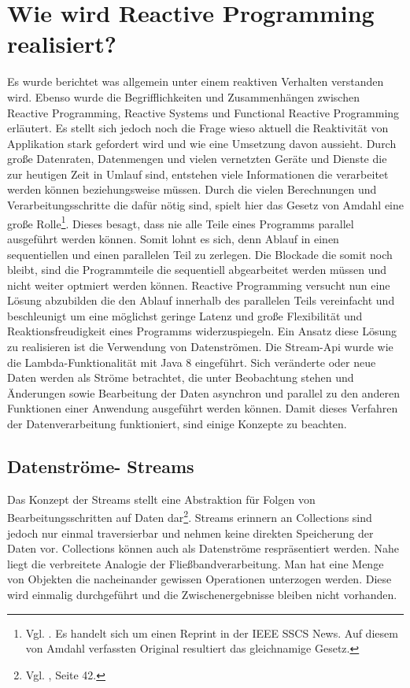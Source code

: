 \section{Wie wird Reactive Programming realisiert?}
Es wurde berichtet was allgemein unter einem reaktiven Verhalten verstanden wird. Ebenso wurde die Begrifflichkeiten und Zusammenhängen zwischen Reactive Programming, Reactive Systems und Functional Reactive Programming erläutert. Es stellt sich jedoch noch die Frage wieso aktuell die Reaktivität von Applikation stark gefordert wird und wie eine Umsetzung davon aussieht. Durch große Datenraten, Datenmengen und vielen vernetzten Geräte und Dienste die zur heutigen Zeit in Umlauf sind, entstehen viele Informationen die verarbeitet werden können beziehungsweise müssen. Durch die vielen Berechnungen und Verarbeitungsschritte die dafür nötig sind, spielt hier das Gesetz von Amdahl eine große Rolle\footnote{Vgl. \cite{Amdahl.}. Es handelt sich um einen Reprint in der IEEE SSCS News. Auf diesem von Amdahl verfassten Original resultiert das gleichnamige Gesetz.}. Dieses besagt, dass nie alle Teile eines Programms parallel ausgeführt werden können. Somit lohnt es sich, denn Ablauf in einen sequentiellen und einen parallelen Teil zu zerlegen. Die Blockade die somit noch bleibt, sind die Programmteile die sequentiell abgearbeitet werden müssen und nicht weiter optmiert werden können. Reactive Programming versucht nun eine Lösung abzubilden die den Ablauf innerhalb des parallelen Teils vereinfacht und beschleunigt um eine möglichst geringe Latenz und große Flexibilität und Reaktionsfreudigkeit eines Programms widerzuspiegeln. Ein Ansatz diese Lösung zu realisieren ist die Verwendung von Datenströmen. Die Stream-Api wurde wie die Lambda-Funktionalität mit Java 8 eingeführt. Sich veränderte oder neue Daten werden als Ströme betrachtet, die unter Beobachtung stehen und Änderungen sowie Bearbeitung der Daten asynchron und parallel zu den anderen Funktionen einer Anwendung ausgeführt werden können. Damit dieses Verfahren der Datenverarbeitung funktioniert, sind einige Konzepte zu beachten.
\subsection{Datenströme- Streams}
Das Konzept der Streams stellt eine Abstraktion für Folgen von Bearbeitungsschritten auf Daten dar\footnote{Vgl. \cite{Inden.2015}, Seite 42.}. Streams erinnern an Collections sind jedoch nur einmal traversierbar und nehmen keine direkten Speicherung der Daten vor. Collections können auch als Datenströme respräsentiert werden. Nahe liegt die verbreitete Analogie der Fließbandverarbeitung. Man hat eine Menge von Objekten die nacheinander gewissen Operationen unterzogen werden. Diese wird einmalig durchgeführt und die Zwischenergebnisse bleiben nicht vorhanden. 

